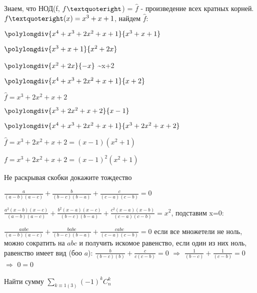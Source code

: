 \documentclass[12pt]{article}
\newenvironment{problem}[2][Problem]
{\begin{trivlist}\item[{\bfseries #1} {\bfseries #2.}]}{\end{trivlist}}
\newenvironment{solutions}[2][Solutions]
{\begin{trivlist}\item[{\bfseries #1} {\bfseries #2.}]}{\end{trivlist}}
\begin{document}
\begin{solutions}{3}
Знаем, что НОД(f, $f \textquoteright$) = $\hat{f}$ - произведение всех кратных корней. $f \textquoteright (x) = x^3+x+1$, найдем $\hat{f}$: 

$\polylongdiv{x^4+x^3+2x^2+x+1}{x^3+x+1}$


$\polylongdiv{x^3+x+1}{x^2+2x}$

$\polylongdiv{x^2+2x}{-x}$ \sim x+2

$\polylongdiv{x^4+x^3+2x^2+x+1}{x+2}$

$\hat{f} = x^3+2x^2+x+2$

$\polylongdiv{x^3+2x^2+x+2}{x-1}$

$\polylongdiv{x^4+x^3+2x^2+x+1}{x^3+2x^2+x+2}$

$\hat{f} = x^3+2x^2+x+2 =(x-1)(x^2+1)$

$f = x^3+2x^2+x+2 =(x-1)^2(x^2+1)$
\end{solutions}

\begin{problem}{4} 
Не раскрывая скобки докажите тождество
\begin{center}
$\frac{a}{(a-b)(a-c)}+\frac{b}{(b-c)(b-a)}+\frac{c}{(c-a)(c-b)} = 0$
\end{center}
\end{problem}

\begin{solutions}{4} 
$\frac{a^2(x-b)(x-c)}{(a-b)(a-c)}+\frac{b^2(x-a)(x-c)}{(b-c)(b-a)}+\frac{c^2(x-a)(x-b)}{(c-a)(c-b)} = x^2$, подставим x=0:

$\frac{a a b c}{(a-b)(a-c)}+\frac{b a b c}{(b-c)(b-a)}+\frac{c a b c}{(c-a)(c-b)} = 0$
если все множетели не ноль, можно сократить на $a b c$ и получить искомое равенство, если один из них ноль, равенство имеет вид (боо $a$):
$\frac{b}{(b-c)(b)}+\frac{c}{c(c-b)} = 0$ $\Rightarrow$ $\frac{1}{(b-c)}+\frac{1}{(c-b)} = 0$ $\Rightarrow$ $0=0$


\end{solutions}

\begin{problem}{5} 
Найти сумму $\sum\limits_{k\equiv1(3)}(-1)^k C^k_n$
\end{problem}
\end{document}
